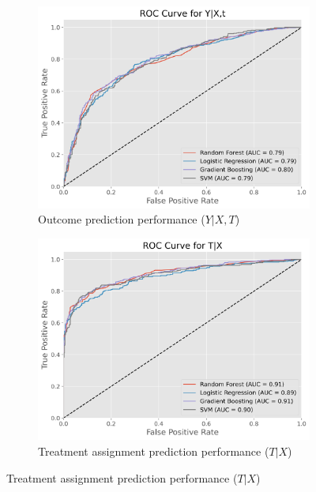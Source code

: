 \documentclass{article}
\begin{document}
\begin{figure}
    \centering
    \caption{Performance comparison of classification models}
    \label{fig:ROC_curves}
    \begin{subfigure}[b]{0.45\textwidth}
        \centering
        \includegraphics[width=\textwidth]{plots/ROC_curve_Y_given_XT.png}
        \caption{Outcome prediction performance ($Y | X, T$)}
        \label{fig:ROC_curve_Y_given_XT}
    \end{subfigure}
    \hfill
    \begin{subfigure}[b]{0.45\textwidth}
        \centering
        \includegraphics[width=\textwidth]{plots/ROC_curve_T_given_X.png}
        \caption{Treatment assignment prediction performance ($T | X$)}
        \label{fig:ROC_curve_T_given_X}
    \end{subfigure}
\end{figure}
\end{document}
